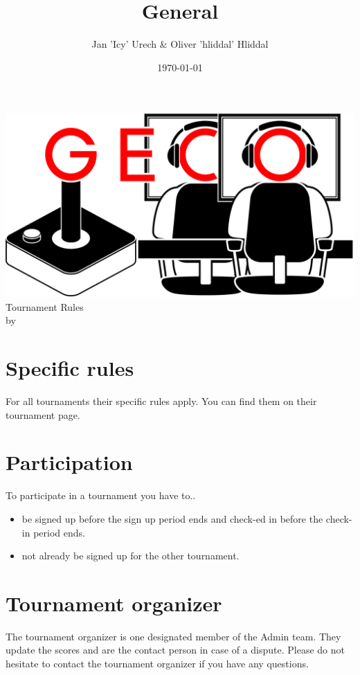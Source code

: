 \documentclass{article}
\title{General }
\author{Jan 'Icy' Urech \& Oliver 'hliddal' Hliddal}
\date{\today}
\begin{document}
\makeatletter
\begin{titlepage}
\centering
\includegraphics[scale=0.075]{img/GECo.png}\\
\LARGE \@title  Tournament Rules\\ \normalsize by \@author\\ \@date
\end{titlepage}
\makeatother


\clearpage

\tableofcontents
\clearpage


\section{Specific rules}
For all tournaments their specific rules apply. You can find them on their tournament page.



\section{Participation} 
To participate in a tournament you have to..
\begin{itemize}
	\item be signed up before the sign up period ends and check-ed in before the check-in period ends.
	\item not already be signed up for the other tournament.
\end{itemize}

\section{Tournament organizer}
The tournament organizer is one designated member of the Admin team. They update the scores and are the contact person in case of a dispute. Please do not hesitate to contact the tournament organizer if you have any questions.
\end{document}

